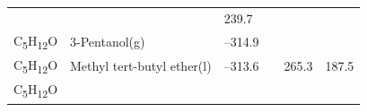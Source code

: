 \documentclass[
  9pt,
]{extbook}
\theoremstyle{definition}
\theoremstyle{definition}
\theoremstyle{definition}
\theoremstyle{remark}
\begin{document}
\begin{longtable}[]{@{}llllll@{}}
\begin{minipage}[t]{0.15\columnwidth}
\strut
\end{minipage} & \begin{minipage}[t]{0.14\columnwidth}\raggedright
\strut
\end{minipage} & \begin{minipage}[t]{0.14\columnwidth}\raggedright
239.7\strut
\end{minipage}\tabularnewline
\begin{minipage}[t]{0.07\columnwidth}\raggedright
C\textsubscript{5}H\textsubscript{12}O\strut
\end{minipage} & \begin{minipage}[t]{0.17\columnwidth}\raggedright
3-Pentanol(g)\strut
\end{minipage} & \begin{minipage}[t]{0.15\columnwidth}\raggedright
--314.9\strut
\end{minipage} & \begin{minipage}[t]{0.15\columnwidth}\raggedright
\strut
\end{minipage} & \begin{minipage}[t]{0.14\columnwidth}\raggedright
\strut
\end{minipage} & \begin{minipage}[t]{0.14\columnwidth}\raggedright
\strut
\end{minipage}\tabularnewline
\begin{minipage}[t]{0.07\columnwidth}\raggedright
C\textsubscript{5}H\textsubscript{12}O\strut
\end{minipage} & \begin{minipage}[t]{0.17\columnwidth}\raggedright
Methyl tert-butyl
ether(l)\strut
\end{minipage} & \begin{minipage}[t]{0.15\columnwidth}\raggedright
--313.6\strut
\end{minipage} & \begin{minipage}[t]{0.15\columnwidth}\raggedright
\strut
\end{minipage} & \begin{minipage}[t]{0.14\columnwidth}\raggedright
265.3\strut
\end{minipage} & \begin{minipage}[t]{0.14\columnwidth}\raggedright
187.5\strut
\end{minipage}\tabularnewline
\begin{minipage}[t]{0.07\columnwidth}\raggedright
C\textsubscript{5}H\textsubscript{12}O\strut
\end{minipage} & \begin{minipage}[t]{0.17\columnwidth}\raggedright

\end{minipage}
\end{longtable}
\end{document}
